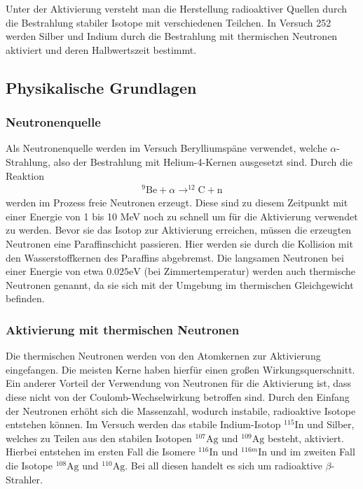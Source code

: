 Unter der Aktivierung versteht man die Herstellung radioaktiver Quellen durch die Bestrahlung stabiler Isotope mit verschiedenen Teilchen. In Versuch 252 werden Silber und Indium durch die Bestrahlung mit thermischen Neutronen aktiviert und deren Halbwertszeit bestimmt.  

\subsection{Physikalische Grundlagen}

\subsubsection*{Neutronenquelle}

Als Neutronenquelle werden im Versuch Berylliumspäne verwendet, welche $\alpha$-Strahlung, also der Bestrahlung mit Helium-4-Kernen ausgesetzt sind. Durch die Reaktion 
\begin{align}
  ^9\mathrm{Be} + \alpha \to ^{12}\mathrm{C} + \mathrm{n}
\end{align}
werden im Prozess freie Neutronen erzeugt. Diese sind zu diesem Zeitpunkt mit einer Energie von 1 bis 10 MeV noch zu schnell um für die Aktivierung verwendet zu werden. Bevor sie das Isotop zur Aktivierung erreichen, müssen die erzeugten Neutronen eine Paraffinschicht passieren. Hier werden sie durch die Kollision mit den Wasserstoffkernen des Paraffins abgebremst. Die langsamen Neutronen bei einer Energie von etwa $0.025\si{\electronvolt}$ (bei Zimmertemperatur) werden auch thermische Neutronen genannt, da sie sich mit der Umgebung im thermischen Gleichgewicht befinden.

\subsubsection*{Aktivierung mit thermischen Neutronen}
Die thermischen Neutronen werden von den Atomkernen zur Aktivierung eingefangen. Die meisten Kerne haben hierfür einen großen Wirkungsquerschnitt. Ein anderer Vorteil der Verwendung von Neutronen für die Aktivierung ist, dass diese nicht von der Coulomb-Wechselwirkung betroffen sind. Durch den Einfang der Neutronen erhöht sich die Massenzahl, wodurch instabile, radioaktive Isotope entstehen können. Im Versuch werden das stabile Indium-Isotop $^{115}\mathrm{In}$ und Silber, welches zu Teilen aus den stabilen Isotopen $^{107}\mathrm{Ag}$ und $^{109}\mathrm{Ag}$ besteht, aktiviert. Hierbei entstehen im ersten Fall die Isomere $^{116}\mathrm{In}$ und $^{116m}\mathrm{In}$ und im zweiten Fall die Isotope $^{108}\mathrm{Ag}$ und $^{110}\mathrm{Ag}$. Bei all diesen handelt es sich um radioaktive $\beta$-Strahler.

